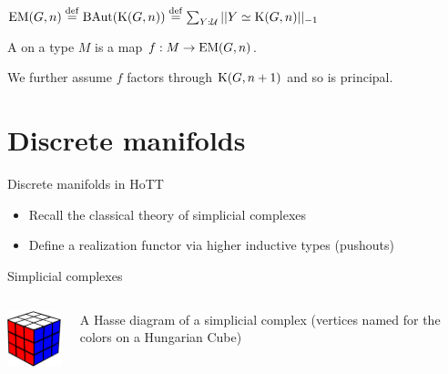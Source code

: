 \documentclass[14pt,aspectratio=169,compress]{beamer}
\begin{document}
\begin{frame}
\begin{definition}
\( \mathrm{EM}(G,n)\stackrel{\mathrm{def}}{=} \operatorname{BAut}(\mathrm{K}(G,n))\stackrel{\mathrm{def}}{=} \sum_{Y:\mathcal{U}}||Y\simeq \mathrm{K}(G,n)||_{-1} \)
\end{definition}
\begin{definition}
A  on a type \( M \) is a map \( f:M\to \mathrm{EM}(G,n) \).
\end{definition}
We further assume \( f \) factors through \( \mathrm{K}(G,n+1) \) and so is principal.
\end{frame}

\section{Discrete manifolds}

\begin{frame}{Discrete manifolds in HoTT}
\begin{itemize}
\item Recall the classical theory of \alert{simplicial complexes}
\item Define a \alert{realization} functor via higher inductive types (pushouts)
\end{itemize}
\end{frame}

\begin{frame}{Simplicial complexes}
\begin{columns}
\begin{column}{0.5\textwidth}
\!\!\!\!\!\vspace{-0.5cm}\resizebox{220pt}{!}{
\begin{tikzpicture}[scale=0.1]

\end{tikzpicture}%
}
\resizebox{90pt}{!}{%

}
\quad
\includegraphics[width=60pt]{figs/hungarian_cube.pdf}
\end{column}
\begin{column}{0.5\textwidth}
A \alert{Hasse diagram} of a simplicial complex (vertices named for the colors on a Hungarian Cube)
\end{column}
\end{columns}
\end{frame}
\end{document}
